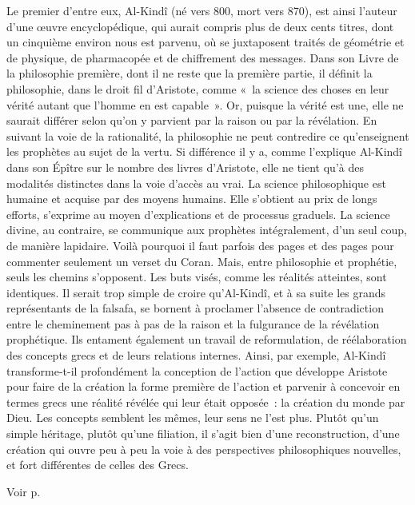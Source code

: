 Le premier d’entre eux, Al-Kindî (né vers 800, mort vers 870), est ainsi l’auteur d’une œuvre encyclopédique, qui aurait compris plus de deux cents titres, dont un cinquième environ nous est parvenu, où se juxtaposent traités de géométrie et de physique, de pharmacopée et de chiffrement des messages. Dans son Livre de la philosophie première, dont il ne reste que la première partie, il définit la philosophie, dans le droit fil d’Aristote, comme « la science des choses en leur vérité autant que
l’homme en est capable ». Or, puisque la vérité est une, elle ne saurait différer selon qu’on y parvient par la raison ou par la révélation. En suivant la voie de la rationalité, la philosophie ne peut contredire ce qu’enseignent les prophètes au sujet de la vertu. Si différence il y a, comme l’explique Al-Kindî dans son Épître sur le nombre des livres d’Aristote, elle ne tient qu’à des modalités distinctes dans la voie d’accès au vrai. La science philosophique est humaine et acquise par des moyens humains. Elle s’obtient au prix de longs efforts, s’exprime au moyen d’explications et de processus graduels. La science divine, au contraire, se communique aux prophètes intégralement, d’un seul coup, de manière lapidaire. Voilà pourquoi il faut parfois des pages et des pages pour commenter seulement un verset du Coran. Mais, entre philosophie et prophétie, seuls les chemins s’opposent. Les buts visés, comme les réalités atteintes, sont identiques. Il serait trop simple de croire qu’Al-Kindî, et à sa suite les grands représentants de la falsafa, se bornent à proclamer l’absence de contradiction
entre le cheminement pas à pas de la raison et la fulgurance de la révélation prophétique. Ils entament également un travail de reformulation, de réélaboration des concepts grecs et de leurs relations internes. Ainsi, par exemple, Al-Kindî transforme-t-il profondément la conception de l’action que développe Aristote pour faire de la création la forme première de l’action et parvenir à concevoir en termes grecs une réalité révélée qui leur était opposée : la création du monde par Dieu. Les concepts semblent les mêmes, leur sens ne l’est plus. Plutôt qu’un simple héritage, plutôt qu’une filiation, il s’agit bien d’une reconstruction, d’une création qui ouvre peu à peu la voie à des perspectives philosophiques nouvelles, et fort différentes de celles des Grecs.

Voir p. \pageref{Theo:AlKindi1}

